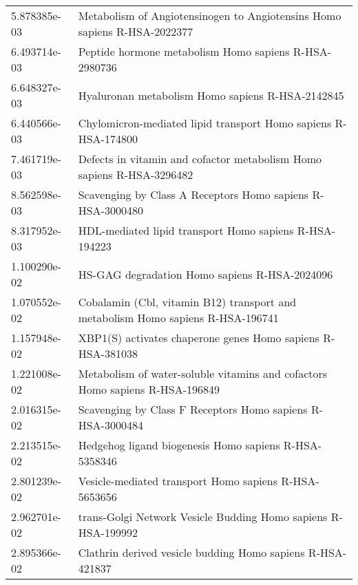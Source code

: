 \begin{longtable}{p{2.4cm}p{14.5cm}}
             5.878385e-03 &                              Metabolism of Angiotensinogen to Angiotensins Homo sapiens R-HSA-2022377 \\
             6.493714e-03 &                                                 Peptide hormone metabolism Homo sapiens R-HSA-2980736 \\
             6.648327e-03 &                                                      Hyaluronan metabolism Homo sapiens R-HSA-2142845 \\
             6.440566e-03 &                                        Chylomicron-mediated lipid transport Homo sapiens R-HSA-174800 \\
             7.461719e-03 &                                 Defects in vitamin and cofactor metabolism Homo sapiens R-HSA-3296482 \\
             8.562598e-03 &                                            Scavenging by Class A Receptors Homo sapiens R-HSA-3000480 \\
             8.317952e-03 &                                                HDL-mediated lipid transport Homo sapiens R-HSA-194223 \\
             1.100290e-02 &                                                         HS-GAG degradation Homo sapiens R-HSA-2024096 \\
             1.070552e-02 &                       Cobalamin (Cbl, vitamin B12) transport and metabolism Homo sapiens R-HSA-196741 \\
             1.157948e-02 &                                           XBP1(S) activates chaperone genes Homo sapiens R-HSA-381038 \\
             1.221008e-02 &                          Metabolism of water-soluble vitamins and cofactors Homo sapiens R-HSA-196849 \\
             2.016315e-02 &                                            Scavenging by Class F Receptors Homo sapiens R-HSA-3000484 \\
             2.213515e-02 &                                                 Hedgehog ligand biogenesis Homo sapiens R-HSA-5358346 \\
             2.801239e-02 &                                                 Vesicle-mediated transport Homo sapiens R-HSA-5653656 \\
             2.962701e-02 &                                         trans-Golgi Network Vesicle Budding Homo sapiens R-HSA-199992 \\
             2.895366e-02 &                                            Clathrin derived vesicle budding Homo sapiens R-HSA-421837 \\

\end{longtable}
